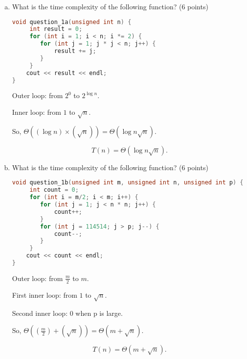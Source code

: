 \documentclass[11pt]{exam}
\begin{document}
\begin{enumerate}[(a)] \label{prb:tiger_code}

    \item What is the time complexity of the following function? (6 points)
          \begin{lstlisting}[language=c++]
void question_1a(unsigned int n) {
	 int result = 0;
	 for (int i = 1; i < n; i *= 2) {
	 	for (int j = 1; j * j < n; j++) {
	 		result += j;
	 	}
	 }
	cout << result << endl;
}
\end{lstlisting}

          \begin{solution}

              Outer loop: from $2^0$ to $2^{\log n}$.

              Inner loop: from $1$ to $\sqrt{n}$.

              So,
              $\Theta((\log n )\times(\sqrt{n}))=\Theta(\log n \sqrt{n})$.

              \[
                  T(n)=\Theta(\log n \sqrt{n}).
              \]
          \end{solution}

    \item What is the time complexity of the following function? (6 points)
          \begin{lstlisting}[language=c++]
void question_1b(unsigned int m, unsigned int n, unsigned int p) {
	 int count = 0;
	 for (int i = m/2; i < m; i++) {
	 	for (int j = 1; j < n * n; j++) {
	 		count++;
	 	}
		for (int j = 114514; j > p; j--) {
			count--;
		}	 
	 }
	cout << count << endl;
}
\end{lstlisting}

          \begin{solution}

              Outer loop: from $\frac{m}{2}$ to $m$.

              First inner loop: from $1$ to $\sqrt{n}$.

              Second inner loop: 0 when p is large.

              So,
              $\Theta((\frac{m}{2} ) + (\sqrt{n}))=\Theta(m+\sqrt{n})$.

              \[
                  T(n) =     \Theta(m+\sqrt{n}).
              \]
          \end{solution}


\end{enumerate}
\end{document}

